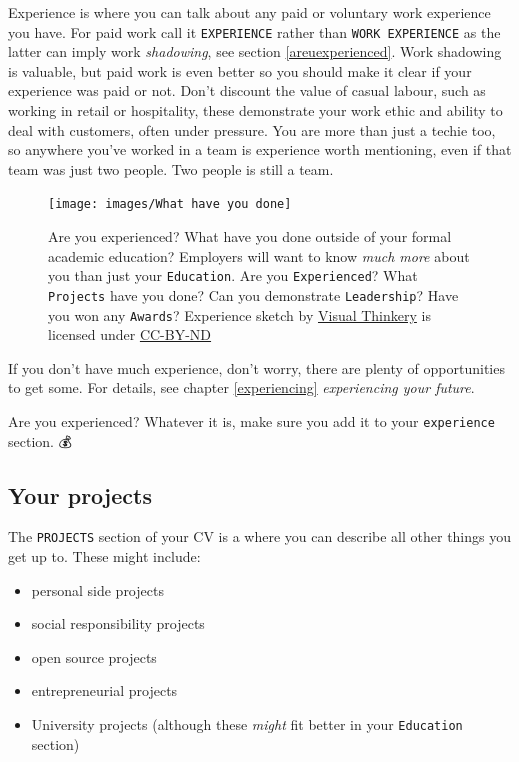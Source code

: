 \documentclass[
]{book}
\providecommand{\tightlist}{%
  \setlength{\itemsep}{0pt}\setlength{\parskip}{0pt}}
\begin{document}
Experience is where you can talk about any paid or voluntary work experience you have. For paid work call it \texttt{EXPERIENCE} rather than \texttt{WORK\ EXPERIENCE} as the latter can imply work \emph{shadowing}, see section \ref{areuexperienced}. Work shadowing is valuable, but paid work is even better so you should make it clear if your experience was paid or not. Don't discount the value of casual labour, such as working in retail or hospitality, these demonstrate your work ethic and ability to deal with customers, often under pressure. You are more than just a techie too, so anywhere you've worked in a team is experience worth mentioning, even if that team was just two people. Two people is still a team.

\begin{figure}

{\centering \texttt{[image: images/What have you done]} 

}

\caption{Are you experienced? What have you done outside of your formal academic education? Employers will want to know \emph{much more} about you than just your \texttt{Education}. Are you \texttt{Experienced}? What \texttt{Projects} have you done? Can you demonstrate \texttt{Leadership}? Have you won any \texttt{Awards}? Experience sketch by \href{https://visualthinkery.com/}{Visual Thinkery} is licensed under \href{https://creativecommons.org/licenses/by-nd/4.0/}{CC-BY-ND}}\label{fig:done-fig}
\end{figure}



If you don't have much experience, don't worry, there are plenty of opportunities to get some. For details, see chapter \ref{experiencing} \emph{experiencing your future}.

Are you experienced? Whatever it is, make sure you add it to your \texttt{experience} section. 💰

\hypertarget{mycvpj}{%
\subsection{Your projects}\label{mycvpj}}

The \texttt{PROJECTS} section of your CV is a where you can describe all other things you get up to. These might include:

\begin{itemize}
\tightlist
\item
  personal side projects
\item
  social responsibility projects
\item
  open source projects
\item
  entrepreneurial projects
\item
  University projects (although these \emph{might} fit better in your \texttt{Education} section)
\end{itemize}
\end{document}
